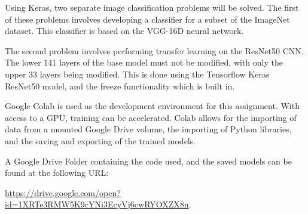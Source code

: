 Using Keras, two separate image classification problems will be solved. The
first of these problems involves developing a classifier for a subset of the
ImageNet dataset. This classifier is based on the VGG-16D neural network.

The second problem involves performing transfer learning on the ResNet50 CNN.
The lower 141 layers of the base model must not be modified, with only the upper
33 layers being modified. This is done using the Tensorflow Keras ResNet50
model, and the freeze functionality which is built in.

Google Colab is used as the development environment for this assignment. With
access to a GPU, training can be accelerated. Colab allows for the importing of
data from a mounted Google Drive volume, the importing of Python libraries, and
the saving and exporting of the trained models.

A Google Drive Folder containing the code used, and the saved models can be
found at the following URL:

\url{https://drive.google.com/open?id=1XRTe3RMW5K9cYNi3EcyVj6cwRYOXZX8n}.
